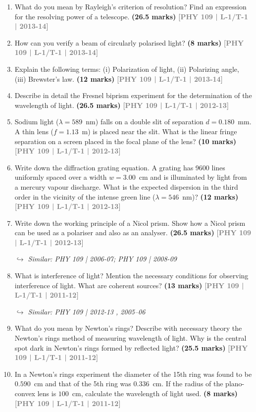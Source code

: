 \documentclass[12pt,a3paper]{article}
\newcommand{\yr}[1]{\hfill\textcolor{gray}{\small\textbf{[#1]}}}
\newcommand{\mk}[1]{\textcolor{orange!70!black}{\small\textbf{(#1 marks)}}}
\newcommand{\variant}[1]{\par\vspace{1pt}\textcolor{blue!50!black}%
  {\footnotesize\textit{$\hookrightarrow$ Similar: #1}}}
\begin{document}
\begin{enumerate}
\item What do you mean by Rayleigh's criterion of resolution? Find an expression for the resolving power of a telescope.
\mk{26.5} \yr{PHY 109 | L-1/T-1 | 2013-14}

\item How can you verify a beam of circularly polarised light?
\mk{8} \yr{PHY 109 | L-1/T-1 | 2013-14}

\item Explain the following terms: (i) Polarization of light, (ii) Polarizing angle, (iii) Brewster's law.
\mk{12} \yr{PHY 109 | L-1/T-1 | 2013-14}

\item Describe in detail the Fresnel biprism experiment for the determination of the wavelength of light.
\mk{26.5} \yr{PHY 109 | L-1/T-1 | 2012-13}

\item Sodium light ($\lambda = 589$~nm) falls on a double slit of separation $d = 0.180$~mm. A thin lens ($f = 1.13$~m) is placed near the slit. What is the linear fringe separation on a screen placed in the focal plane of the lens?
\mk{10} \yr{PHY 109 | L-1/T-1 | 2012-13}

\item Write down the diffraction grating equation. A grating has 9600 lines uniformly spaced over a width $w = 3.00$~cm and is illuminated by light from a mercury vapour discharge. What is the expected dispersion in the third order in the vicinity of the intense green line ($\lambda = 546$~nm)?
\mk{12} \yr{PHY 109 | L-1/T-1 | 2012-13}

\item Write down the working principle of a Nicol prism. Show how a Nicol prism can be used as a polariser and also as an analyser.
\mk{26.5} \yr{PHY 109 | L-1/T-1 | 2012-13}
\variant{PHY 109 | 2006-07; PHY 109 | 2008-09}

\item What is interference of light? Mention the necessary conditions for observing interference of light. What are coherent sources?
\mk{13} \yr{PHY 109 | L-1/T-1 | 2011-12}
\variant{PHY 109 | 2012-13 , 2005--06}

\item What do you mean by Newton's rings? Describe with necessary theory the Newton's rings method of measuring wavelength of light. Why is the central spot dark in Newton's rings formed by reflected light?
\mk{25.5} \yr{PHY 109 | L-1/T-1 | 2011-12}

\item In a Newton's rings experiment the diameter of the 15th ring was found to be $0.590$~cm and that of the 5th ring was $0.336$~cm. If the radius of the plano-convex lens is $100$~cm, calculate the wavelength of light used.
\mk{8} \yr{PHY 109 | L-1/T-1 | 2011-12}


\end{enumerate}
\end{document}
